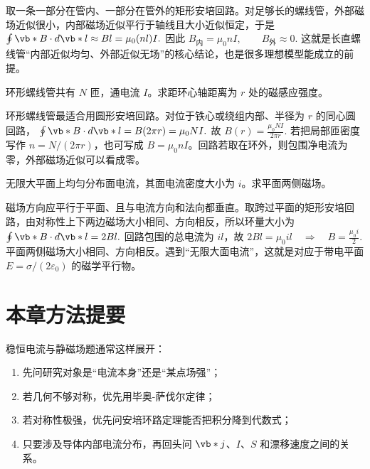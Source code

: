 \documentclass[lang=cn,11pt]{elegantbook}
\begin{document}
\begin{solution}
取一条一部分在管内、一部分在管外的矩形安培回路。对足够长的螺线管，外部磁场近似很小，内部磁场近似平行于轴线且大小近似恒定，于是
 \(\oint \vb*{B}\cdot d\vb*{l}\approx Bl=\mu_0(nl)I.\) 
因此
 \(\boxed{B_{\text{内}}=\mu_0nI}, \qquad \boxed{B_{\text{外}}\approx 0}.\) 
这就是长直螺线管“内部近似均匀、外部近似无场”的核心结论，也是很多理想模型能成立的前提。
\end{solution}

\begin{exercise}[环形螺线管中的磁场]
环形螺线管共有 \(N\) 匝，通电流 \(I\)。求距环心轴距离为 \(r\) 处的磁感应强度。
\end{exercise}

\begin{solution}
环形螺线管最适合用圆形安培回路。对位于铁心或绕组内部、半径为 \(r\) 的同心圆回路，
 \(\oint \vb*{B}\cdot d\vb*{l}=B(2\pi r)=\mu_0NI.\) 
故
 \(\boxed{ B(r)=\frac{\mu_0NI}{2\pi r} }.\) 
若把局部匝密度写作 \(n=N/(2\pi r)\)，也可写成 \(B=\mu_0nI\)。回路若取在环外，则包围净电流为零，外部磁场近似可以看成零。
\end{solution}

\begin{exercise}[无限大均匀平面电流的磁场]
无限大平面上均匀分布面电流，其面电流密度大小为 \(i\)。求平面两侧磁场。
\end{exercise}

\begin{solution}
磁场方向应平行于平面、且与电流方向和法向都垂直。取跨过平面的矩形安培回路，由对称性上下两边磁场大小相同、方向相反，所以环量大小为
 \(\oint \vb*{B}\cdot d\vb*{l}=2Bl.\) 
回路包围的总电流为 \(il\)，故
 \(2Bl=\mu_0 il \quad\Longrightarrow\quad \boxed{ B=\frac{\mu_0 i}{2} }.\) 
平面两侧磁场大小相同、方向相反。遇到“无限大面电流”，这就是对应于带电平面 \(E=\sigma/(2\varepsilon_0)\) 的磁学平行物。
\end{solution}

\section{本章方法提要}

稳恒电流与静磁场题通常这样展开：
\begin{enumerate}
 \item 先问研究对象是“电流本身”还是“某点场强”；
 \item 若几何不够对称，优先用毕奥-萨伐尔定律；
 \item 若对称性极强，优先问安培环路定理能否把积分降到代数式；
 \item 只要涉及导体内部电流分布，再回头问 \(\vb*{j}\)、\(I\)、\(S\) 和漂移速度之间的关系。
\end{enumerate}
\end{document}
